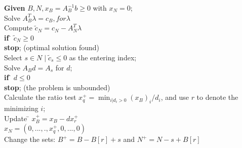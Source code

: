 \documentclass[a4paper,10 pt,titlepage,twoside]{book}
\theoremstyle{plain}
\theoremstyle{definition}
\theoremstyle{remark}
\begin{document}
\begin{tabbing}
	\textbf{Given} $B, N, x_{B} = A_{B}^{-1}b\geq 0$ with $x_{N}=0$;\\
	Solve $A_{B}^{T}\lambda = c_{B}, for \lambda$ \\
	Compute $\widetilde{c}_{N}=c_{N}-A_{N}^{T}\lambda$\\
	\textbf{if} \= $\widetilde{c}_{N}\geq 0$\\
	\>\textbf{stop}; (optimal solution found)\\
	Select $s\in N\;|\;\widetilde{c}_{s}\leq 0$ as the entering index;\\
	Solve $A_{B}d = A_{s}$ for $d$;\\
	\textbf{if} \= $d \leq 0$\\
	\> \textbf{stop}; (the problem is unbounded)\\  
	Calculate the ratio test $x_{q}^{+} = \min_{i | d_{i} > 0}(x_{B})_{i}/d_{i}$, and use $r$ to denote the minimizing $i$;\\
	Update \= $x_{B}^{+} = x_{B}-dx_{r}^{+}$\\
	\> $x_{N} = (0,...,.,x_{q}^{+},0,...,0)$\\
	Change the sets: $B^{+} = B - B[r] + s$ and $N^{+} = N - s + B[r]$\\ 
\end{tabbing}
\end{document}
